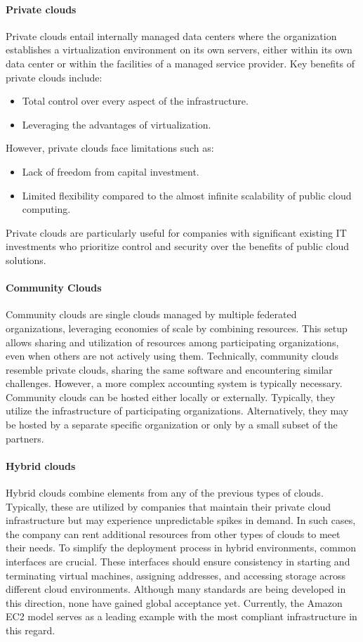 \paragraph*{Private clouds}
Private clouds entail internally managed data centers where the organization establishes a virtualization environment on its own servers, either within its own data center or within the facilities of a managed service provider.
Key benefits of private clouds include:
\begin{itemize}
    \item Total control over every aspect of the infrastructure.
    \item Leveraging the advantages of virtualization.
\end{itemize}
However, private clouds face limitations such as:
\begin{itemize}
    \item Lack of freedom from capital investment.
    \item Limited flexibility compared to the almost infinite scalability of public cloud computing.
\end{itemize}
Private clouds are particularly useful for companies with significant existing IT investments who prioritize control and security over the benefits of public cloud solutions.

\paragraph*{Community Clouds}
Community clouds are single clouds managed by multiple federated organizations, leveraging economies of scale by combining resources. 
This setup allows sharing and utilization of resources among participating organizations, even when others are not actively using them.
Technically, community clouds resemble private clouds, sharing the same software and encountering similar challenges. 
However, a more complex accounting system is typically necessary.
Community clouds can be hosted either locally or externally. 
Typically, they utilize the infrastructure of participating organizations.
Alternatively, they may be hosted by a separate specific organization or only by a small subset of the partners.

\paragraph*{Hybrid clouds}
Hybrid clouds combine elements from any of the previous types of clouds. 
Typically, these are utilized by companies that maintain their private cloud infrastructure but may experience unpredictable spikes in demand. 
In such cases, the company can rent additional resources from other types of clouds to meet their needs.
To simplify the deployment process in hybrid environments, common interfaces are crucial. 
These interfaces should ensure consistency in starting and terminating virtual machines, assigning addresses, and accessing storage across different cloud environments. 
Although many standards are being developed in this direction, none have gained global acceptance yet.
Currently, the Amazon EC2 model serves as a leading example with the most compliant infrastructure in this regard.

